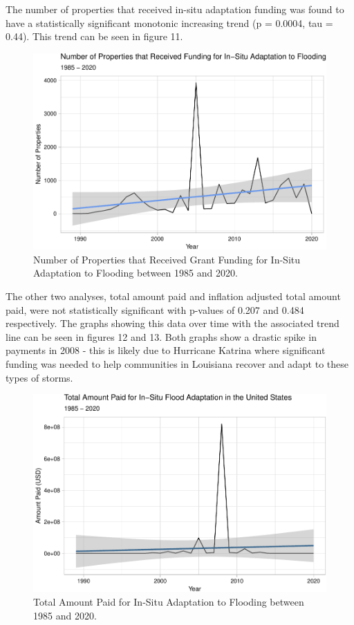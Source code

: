 \documentclass[
  12pt,
]{article}
\begin{document}
The number of properties that received in-situ adaptation funding was
found to have a statistically significant monotonic increasing trend (p
= 0.0004, tau = 0.44). This trend can be seen in figure 11.

\begin{figure}
\centering
\includegraphics{finalreport_files/figure-latex/unnamed-chunk-20-1.pdf}
\caption{Number of Properties that Received Grant Funding for In-Situ
Adaptation to Flooding between 1985 and 2020.}
\end{figure}

The other two analyses, total amount paid and inflation adjusted total
amount paid, were not statistically significant with p-values of 0.207
and 0.484 respectively. The graphs showing this data over time with the
associated trend line can be seen in figures 12 and 13. Both graphs show
a drastic spike in payments in 2008 - this is likely due to Hurricane
Katrina where significant funding was needed to help communities in
Louisiana recover and adapt to these types of storms.

\newpage

\begin{figure}
\centering
\includegraphics{finalreport_files/figure-latex/unnamed-chunk-21-1.pdf}
\caption{Total Amount Paid for In-Situ Adaptation to Flooding between
1985 and 2020.}
\end{figure}
\end{document}
